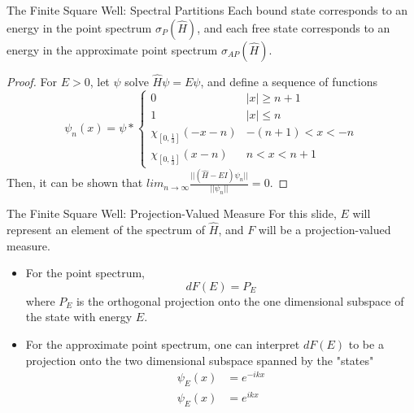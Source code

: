 \documentclass{beamer}
\begin{document}
\begin{frame}{The Finite Square Well: Spectral Partitions}
    Each bound state corresponds to an energy in the point spectrum
    $\sigma_P(\hat{H})$, and each free state corresponds to an energy in the
    approximate point spectrum $\sigma_{AP}(\hat{H})$.

    \begin{proof}
        For $E>0$, let $\psi$ solve $\hat{H}\psi=E\psi$, and define a sequence
        of functions
        \[
            \psi_n(x) = \psi *
            \begin{cases}
                0 & |x| \geq n+1\\
                1 & |x| \leq n \\
                \chi_{[0,\frac{1}{3}]}(-x-n) & -(n+1)<x<-n\\
                \chi_{[0,\frac{1}{3}]}(x-n) & n<x<n+1
            \end{cases}
            \]
        Then, it can be shown that
        $lim_{n\to\infty}\frac{||(\hat{H}-EI)\psi_n||}{||\psi_n||} = 0$.
    \end{proof}
\end{frame}

\begin{frame}{The Finite Square Well: Projection-Valued Measure}
    For this slide, $E$ will represent an element of the spectrum of $\hat{H}$,
    and $F$ will be a projection-valued measure.

    \begin{itemize}
        \item For the point spectrum, 
    \[
        dF(E) = P_E
    \]
    where $P_E$ is the orthogonal
    projection onto the one dimensional subspace of the state with energy $E$.

\item For the approximate point spectrum, one can interpret $dF(E)$ to be a
    projection onto the two dimensional subspace spanned by the "states"
    \[
        \begin{aligned}
            \psi_{E}(x) &= e^{-ikx} \\
            \psi_{E}(x) &= e^{ikx}
        \end{aligned}
    \]
    \end{itemize}
\end{frame}
\end{document}
